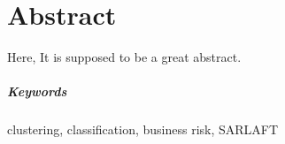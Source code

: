 \chapter{Abstract}
\label{chap:resumen}

Here, It is supposed to be a great abstract.

\vspace{1em}
\noindent
\paragraph*{Keywords} clustering, classification, business risk, SARLAFT

